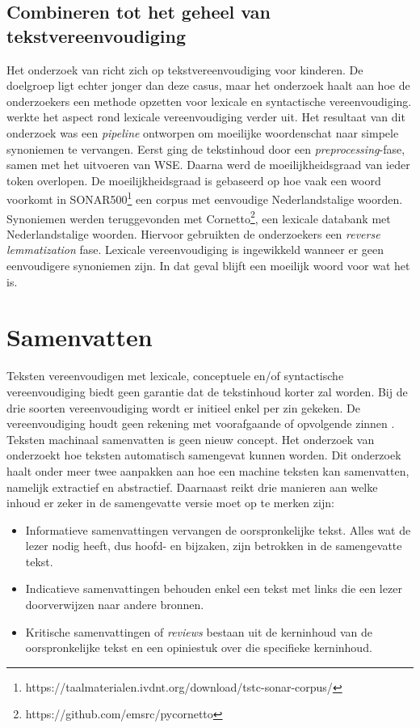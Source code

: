 \subsection{Combineren tot het geheel van tekstvereenvoudiging}

Het onderzoek van \textcite{DeBelder2010} richt zich op tekstvereenvoudiging voor kinderen. De doelgroep ligt echter jonger dan deze casus, maar het onderzoek haalt aan hoe de onderzoekers een methode opzetten voor lexicale en syntactische vereenvoudiging. \textcite{Bulte2018} werkte het aspect rond lexicale vereenvoudiging verder uit. Het resultaat van dit onderzoek was een \textit{pipeline} ontworpen om moeilijke woordenschat naar simpele synoniemen te vervangen. Eerst ging de tekstinhoud door een \textit{preprocessing}-fase, samen met het uitvoeren van WSE. Daarna werd de moeilijkheidsgraad van ieder token overlopen. De moeilijkheidsgraad is gebaseerd op hoe vaak een woord voorkomt in SONAR500\footnote{https://taalmaterialen.ivdnt.org/download/tstc-sonar-corpus/} een corpus met eenvoudige Nederlandstalige woorden. Synoniemen werden teruggevonden met Cornetto\footnote{https://github.com/emsrc/pycornetto}, een lexicale databank met Nederlandstalige woorden. Hiervoor gebruikten de onderzoekers een \textit{reverse lemmatization} fase. Lexicale vereenvoudiging is ingewikkeld wanneer er geen eenvoudigere synoniemen zijn. In dat geval blijft een moeilijk woord voor wat het is.

\section{Samenvatten}

Teksten vereenvoudigen met lexicale, conceptuele en/of syntactische vereenvoudiging biedt geen garantie dat de tekstinhoud korter zal worden. Bij de drie soorten vereenvoudiging wordt er initieel enkel per zin gekeken. De vereenvoudiging houdt geen rekening met voorafgaande of opvolgende zinnen \autocite{Dubay2004}. Teksten machinaal samenvatten is geen nieuw concept. Het onderzoek van \textcite{Hahn2000} onderzoekt hoe teksten automatisch samengevat kunnen worden. Dit onderzoek haalt onder meer twee aanpakken aan hoe een machine teksten kan samenvatten, namelijk extractief en abstractief. Daarnaast reikt \textcite{Hahn2000} drie manieren aan welke inhoud er zeker in de samengevatte versie moet op te merken zijn:

\begin{itemize}
	\item Informatieve samenvattingen vervangen de oorspronkelijke tekst. Alles wat de lezer nodig heeft, dus hoofd- en bijzaken, zijn betrokken in de samengevatte tekst.
	\item Indicatieve samenvattingen behouden enkel een tekst met links die een lezer doorverwijzen naar andere bronnen. 
	\item Kritische samenvattingen of \textit{reviews} bestaan uit de kerninhoud van de oorspronkelijke tekst en een opiniestuk over die specifieke kerninhoud.
\end{itemize}

